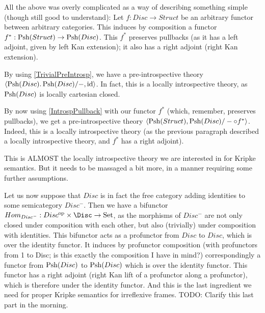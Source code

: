 \begin{TODOblock}
All the above was overly complicated as a way of describing something simple (though still good to understand): Let $f : Disc \to Struct$ be an arbitrary functor between arbitrary categories. This induces by composition a functor $f^* : \operatorname{Psh}(Struct) \to \operatorname{Psh}(Disc)$. This $f^*$ preserves pullbacks (as it has a left adjoint, given by left Kan extension); it also has a right adjoint (right Kan extension).

By using \cref{TrivialPreIntrosp}, we have a pre-introspective theory $\langle \operatorname{Psh}(Disc). \operatorname{Psh}(Disc)/-, \mathrm{id} \rangle$. In fact, this is a locally introspective theory, as $\operatorname{Psh}(Disc)$ is locally cartesian closed.

By now using \cref{IntrospPullback} with our functor $f^*$ (which, remember, preserves pullbacks), we get a pre-introspective theory $\langle \operatorname{Psh}(Struct), \operatorname{Psh}(Disc)/- \circ f^*\rangle$. Indeed, this is a locally introspective theory (as the previous paragraph described a locally introspective theory, and $f^*$ has a right adjoint).

This is ALMOST the locally introspective theory we are interested in for Kripke semantics. But it needs to be massaged a bit more, in a manner requiring some further assumptions.

Let us now suppose that $Disc$ is in fact the free category adding identities to some semicategory $Disc^-$. Then we have a bifunctor $Hom_{Disc^-} : \op{Disc} \times \Disc \to \Set$, as the morphisms of $Disc^-$ are not only closed under composition with each other, but also (trivially) under composition with identities. This bifunctor acts as a profunctor from $Disc$ to $Disc$, which is over the identity functor. It induces by profunctor composition (with profunctors from 1 to Disc; is this exactly the composition I have in mind?) correspondingly a functor from $\operatorname{Psh}(Disc)$ to $\operatorname{Psh}(Disc)$ which is over the identity functor. This functor has a right adjoint (right Kan lift of a profunctor along a profunctor), which is therefore under the identity functor. And this is the last ingredient we need for proper Kripke semantics for irreflexive frames. TODO: Clarify this last part in the morning.
\end{TODOblock}